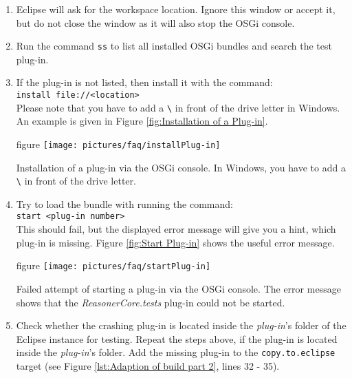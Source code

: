 \begin{description}
\begin{enumerate}
\begin{nofloat}{figure}
				\fi
				\centering
				\caption[Opening the OSGi console]{Command for opening the OSGi console. This must be done inside the \textit{plug-in}'s folder of the Eclipse instance for testing after running the build script.}
				\label{fig:Opening the OSGi console}
			\end{nofloat}
		\item Eclipse will ask for the workspace location. Ignore this window or accept it, but do not close the window as it will also stop the OSGi console.
		\item Run the command \texttt{ss} to list all installed OSGi bundles and search the test plug-in.
		\item If the plug-in is not listed, then install it with the command:\\
			\texttt{install file://<location>}\\
			Please note that you have to add a \texttt{\textbackslash} in front of the drive letter in Windows. An example is given in Figure \vref{fig:Installation of a Plug-in}.
			\begin{nofloat}{figure}
				\ifpdf	
				\hspace{-1.85cm}\texttt{[image: pictures/faq/installPlug-in]}
				\fi
				\centering
				\caption[Installation of a plug-in]{Installation of a plug-in via the OSGi console. In Windows, you have to add a  \texttt{\textbackslash} in front of the drive letter.}
				\label{fig:Installation of a Plug-in}
			\end{nofloat}
		\item Try to load the bundle with running the command:\\
			\texttt{start <plug-in number>}\\
			This should fail, but the displayed error message will give you a hint, which plug-in is missing. Figure \vref{fig:Start Plug-in} shows the useful error message.
			\begin{nofloat}{figure}
				\ifpdf	
				\hspace{-1.85cm}\texttt{[image: pictures/faq/startPlug-in]}
				\fi
				\centering
				\caption[Failed attempt of starting a plug-in]{Failed attempt of starting a plug-in via the OSGi console. The error message shows that the \textit{ReasonerCore.tests} plug-in could not be started.}
				\label{fig:Start Plug-in}
			\end{nofloat}
		\item Check whether the crashing plug-in is located inside the \textit{plug-in}'s folder of the Eclipse instance for testing. Repeat the steps above, if the plug-in is located inside the \textit{plug-in}'s folder. Add the missing plug-in to the \texttt{copy.to.eclipse} target (see Figure \vref{lst:Adaption of build part 2}, lines 32 - 35).
	\end{enumerate}
\end{description}
\newpage
